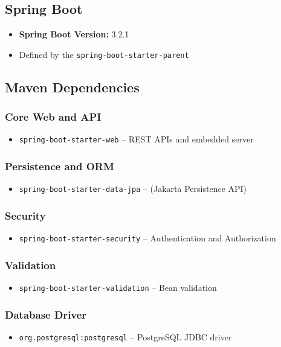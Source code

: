 \documentclass[a4paper,11pt]{article}
\begin{document}
\subsection{Spring Boot}
\begin{itemize}
    \item \textbf{Spring Boot Version:} 3.2.1
    \item Defined by the \texttt{spring-boot-starter-parent}
\end{itemize}

\subsection{Maven Dependencies}

\subsubsection*{Core Web and API}
\begin{itemize}
    \item \texttt{spring-boot-starter-web} – REST APIs and embedded server
\end{itemize}

\subsubsection*{Persistence and ORM}
\begin{itemize}
    \item \texttt{spring-boot-starter-data-jpa} – (Jakarta Persistence API)
\end{itemize}

\subsubsection*{Security}
\begin{itemize}
    \item \texttt{spring-boot-starter-security} – Authentication and Authorization
\end{itemize}

\subsubsection*{Validation}
\begin{itemize}
    \item \texttt{spring-boot-starter-validation} – Bean validation
\end{itemize}

\subsubsection*{Database Driver}
\begin{itemize}
    \item \texttt{org.postgresql:postgresql} – PostgreSQL JDBC driver
\end{itemize}
\end{document}
